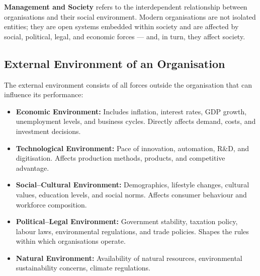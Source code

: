 \documentclass[12pt,a4paper]{article}
\begin{document}
\begin{tcolorbox}[defbox, title={\textbf{Management and Society --- Overview}}]
\textbf{Management and Society} refers to the interdependent relationship between organisations and their social environment. Modern organisations are not isolated entities; they are open systems embedded within society and are affected by social, political, legal, and economic forces --- and, in turn, they affect society.
\end{tcolorbox}

\subsection{External Environment of an Organisation}
The external environment consists of all forces outside the organisation that can influence its performance:

\begin{tcolorbox}[tikzbox, title={External Environment of an Organisation}]
\centering
{}
\end{tcolorbox}

\begin{itemize}[leftmargin=*, itemsep=3pt]
  \item \textbf{Economic Environment:} Includes inflation, interest rates, GDP growth, unemployment levels, and business cycles. Directly affects demand, costs, and investment decisions.
  \item \textbf{Technological Environment:} Pace of innovation, automation, R\&D, and digitisation. Affects production methods, products, and competitive advantage.
  \item \textbf{Social--Cultural Environment:} Demographics, lifestyle changes, cultural values, education levels, and social norms. Affects consumer behaviour and workforce composition.
  \item \textbf{Political--Legal Environment:} Government stability, taxation policy, labour laws, environmental regulations, and trade policies. Shapes the rules within which organisations operate.
  \item \textbf{Natural Environment:} Availability of natural resources, environmental sustainability concerns, climate regulations.
\end{itemize}
\end{document}
